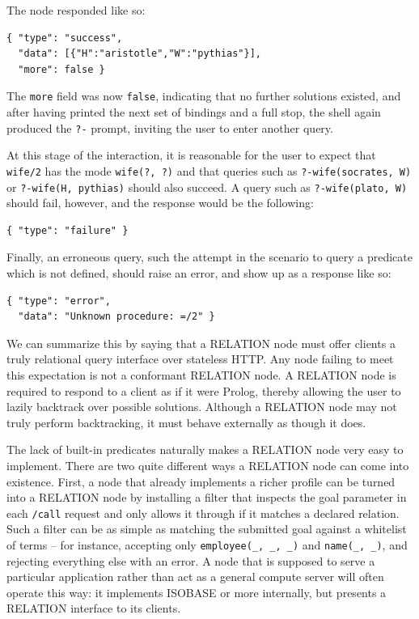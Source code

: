 \noindent The node responded like so:

\begin{verbatim}
{ "type": "success",
  "data": [{"H":"aristotle","W":"pythias"}], 
  "more": false }
\end{verbatim}

\noindent The \texttt{more} field was now \texttt{false}, indicating that no further solutions existed, and after having printed the next set of bindings and a full stop, the shell again produced the \texttt{?-} prompt, inviting the user to enter another query.

At this stage of the interaction, it is reasonable for the user to expect that \texttt{wife/2} has the mode \texttt{wife(?,\,?)} and that queries such as \texttt{?-wife(socrates,\,W)} or \texttt{?-wife(H,\,pythias)} should also succeed. A query such as \texttt{?-wife(plato,\,W)} should fail, however, and the response would be the following:

\begin{verbatim}
{ "type": "failure" }
\end{verbatim}

\noindent Finally, an erroneous query, such the attempt in the scenario to query a predicate which is not defined, should raise an error, and show up as a response like so:

\begin{verbatim}
{ "type": "error",
  "data": "Unknown procedure: =/2" }
\end{verbatim}

\noindent We can summarize this by saying that a RELATION node must offer clients a truly relational query interface over stateless HTTP. Any node failing to meet this expectation is not a conformant RELATION node. A RELATION node is required to respond to a client as if it were Prolog, thereby allowing the user to lazily backtrack over possible solutions. Although a RELATION node may not truly perform backtracking, it must behave externally as though it does. 

\medskip
\noindent The lack of built-in predicates naturally makes a RELATION node very easy to implement. There are two quite different ways a RELATION node can come into existence. First, a node that already implements a richer profile can be turned into a RELATION node by installing a filter that inspects the goal parameter in each \texttt{/call} request and only allows it through if it matches a declared relation. Such a filter can be as simple as matching the submitted goal against a whitelist of terms -- for instance, accepting only \texttt{employee(\_,\,\_,\,\_)} and \texttt{name(\_,\,\_)}, and rejecting everything else with an error. A node that is supposed to serve a particular application rather than act as a general compute server will often operate this way: it implements ISOBASE or more internally, but presents a RELATION interface to its clients.

